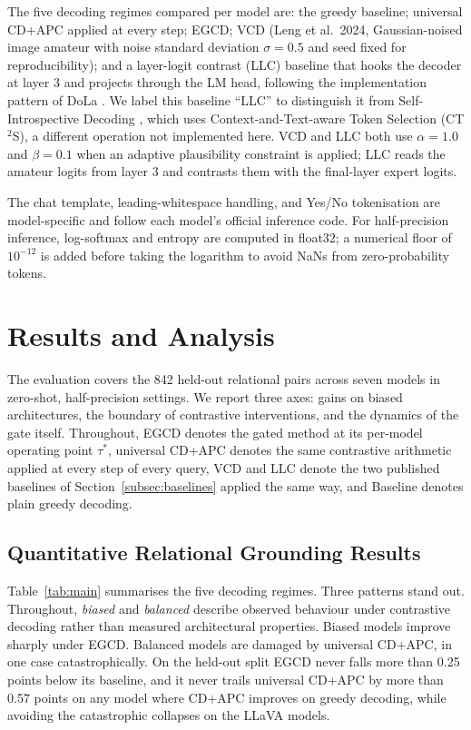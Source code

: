 \documentclass[pdflatex,sn-basic,Numbered]{sn-jnl}
\theoremstyle{thmstyleone}
\theoremstyle{thmstyletwo}
\theoremstyle{thmstylethree}
\begin{document}
The five decoding regimes compared per model are: the greedy baseline; universal CD+APC applied at every step; EGCD; VCD (Leng et al.\ 2024, Gaussian-noised image amateur with noise standard deviation $\sigma = 0.5$ and seed fixed for reproducibility); and a layer-logit contrast (LLC) baseline that hooks the decoder at layer 3 and projects through the LM head, following the implementation pattern of DoLa \cite{chuang2024dola}. We label this baseline ``LLC'' to distinguish it from Self-Introspective Decoding \cite{huo2025self}, which uses Context-and-Text-aware Token Selection (CT$^{2}$S), a different operation not implemented here. VCD and LLC both use $\alpha = 1.0$ and $\beta = 0.1$ when an adaptive plausibility constraint is applied; LLC reads the amateur logits from layer 3 and contrasts them with the final-layer expert logits.

The chat template, leading-whitespace handling, and Yes/No tokenisation are model-specific and follow each model's official inference code. For half-precision inference, log-softmax and entropy are computed in float32; a numerical floor of $10^{-12}$ is added before taking the logarithm to avoid NaNs from zero-probability tokens.

\section{Results and Analysis}\label{sec:results}

The evaluation covers the 842 held-out relational pairs across seven models in zero-shot, half-precision settings. We report three axes: gains on biased architectures, the boundary of contrastive interventions, and the dynamics of the gate itself. Throughout, EGCD denotes the gated method at its per-model operating point $\tau^{*}$, universal CD+APC denotes the same contrastive arithmetic applied at every step of every query, VCD and LLC denote the two published baselines of Section~\ref{subsec:baselines} applied the same way, and Baseline denotes plain greedy decoding.

\subsection{Quantitative Relational Grounding Results}\label{subsec:quant}

Table~\ref{tab:main} summarises the five decoding regimes. Three patterns stand out. Throughout, \emph{biased} and \emph{balanced} describe observed behaviour under contrastive decoding rather than measured architectural properties. Biased models improve sharply under EGCD. Balanced models are damaged by universal CD+APC, in one case catastrophically. On the held-out split EGCD never falls more than 0.25 points below its baseline, and it never trails universal CD+APC by more than 0.57 points on any model where CD+APC improves on greedy decoding, while avoiding the catastrophic collapses on the LLaVA models.
\end{document}
